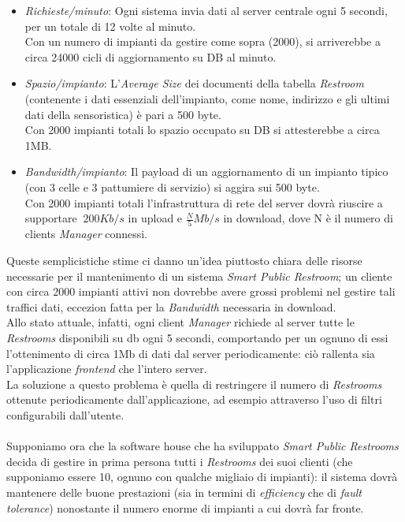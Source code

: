 \documentclass[12pt]{article}
\begin{document}
\begin{itemize}
\item \textit{Richieste/minuto}: Ogni sistema invia dati al server centrale ogni 5 secondi, per un totale di 12 volte al minuto.\\
Con un numero di impianti da gestire come sopra (2000), si arriverebbe a circa 24000 cicli di aggiornamento su DB al minuto.
\item \textit{Spazio/impianto}: L'\textit{Average Size} dei documenti della tabella \textit{Restroom} (contenente i dati essenziali dell'impianto, come nome, indirizzo e gli ultimi dati della sensoristica) è pari a 500 byte.\\
Con 2000 impianti totali lo spazio occupato su DB si attesterebbe a circa 1MB.
\item \textit{Bandwidth/impianto}: Il payload di un aggiornamento di un impianto tipico (con 3 celle e 3 pattumiere di servizio) si aggira sui 500 byte.\\
Con 2000 impianti totali l'infrastruttura di rete del server dovrà riuscire a supportare $~200Kb/s$ in upload e $\frac{N}{5}Mb/s$ in download, dove N è il numero di clients \textit{Manager} connessi.
\end{itemize}
Queste semplicistiche stime ci danno un'idea piuttosto chiara delle risorse necessarie per il mantenimento di un sistema \textit{Smart Public Restroom}; un cliente con circa 2000 impianti attivi non dovrebbe avere grossi problemi nel gestire tali traffici dati, eccezion fatta per la \textit{Bandwidth} necessaria in download.\\
Allo stato attuale, infatti, ogni client \textit{Manager} richiede al server tutte le \textit{Restrooms} disponibili su db ogni 5 secondi, comportando per un ognuno di essi l'ottenimento di circa 1Mb di dati dal server periodicamente: ciò rallenta sia l'applicazione \textit{frontend} che l'intero server.\\
La soluzione a questo problema è quella di restringere il numero di \textit{Restrooms} ottenute periodicamente dall'applicazione, ad esempio attraverso l'uso di filtri configurabili dall'utente.\\\\
Supponiamo ora che la software house che ha sviluppato \textit{Smart Public Restrooms} decida di gestire in prima persona tutti i \textit{Restrooms} dei suoi clienti (che supponiamo essere 10, ognuno con qualche migliaio di impianti): il sistema dovrà mantenere delle buone prestazioni (sia in termini di \textit{efficiency} che di \textit{fault tolerance}) nonostante il numero enorme di impianti a cui dovrà far fronte.\\\\
\end{document}
